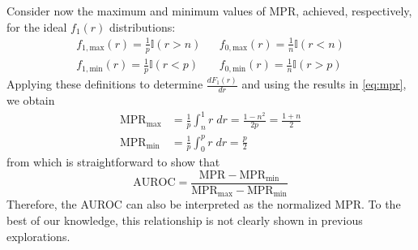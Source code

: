 Consider now the maximum and minimum values of MPR, achieved, respectively, for the ideal $f_1(r)$ distributions:
%
\begin{align}
    f_{1, \text{max}}(r) = \frac{1}{p}\mathbb{I}(r > n) &&
    f_{0, \text{max}}(r) = \frac{1}{n}\mathbb{I}(r < n)\\
    f_{1, \text{min}}(r) = \frac{1}{p}\mathbb{I}(r < p) &&
    f_{0, \text{min}}(r) = \frac{1}{n}\mathbb{I}(r > p)
\end{align}
%
Applying these definitions to determine $\frac{dF_1(r)}{dr}$ and using the results in \autoref{eq:mpr}, we obtain
%
%
%
%
%
\begin{align}
    \text{MPR}_\text{max}
        &= \frac{1}{p} \int_n^1 r\;dr
        = \frac{1 - n^2}{2p}
        = \frac{1 + n}{2}
    \\
    \text{MPR}_\text{min} &= \frac{1}{p} \int_0^p r\;dr = \frac{p}{2}
\end{align}
%
from which is straightforward to show that
%
\begin{equation}
    \text{AUROC}
        = \frac{
            \text{MPR} - \text{MPR}_\text{min}
        }{
            \text{MPR}_\text{max} - \text{MPR}_\text{min}
        }
\end{equation}
%
Therefore, the AUROC can also be interpreted as the normalized MPR.
To the best of our knowledge, this relationship is not clearly shown in previous explorations.  %

